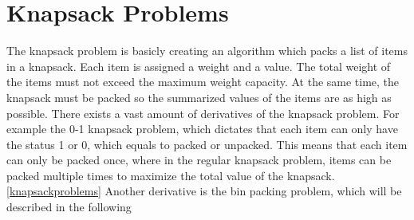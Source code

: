 

\section{Knapsack Problems}
\label{sec:knapsack}
The knapsack problem is basicly creating an algorithm which packs a list of items in a knapsack. Each item is assigned a weight and a value. The total weight of the items must not exceed the maximum weight capacity. At the same time, the knapsack must be packed so the summarized values of the items are as high as possible.   
There exists a vast amount of derivatives of the knapsack problem. For example the 0-1 knapsack problem, which dictates that each item can only have the status 1 or 0, which equals to packed or unpacked. This means that each item can only be packed once, where in the regular knapsack problem, items can be packed multiple times to maximize the total value of the knapsack. \ref{knapsackproblems}
\newline
Another derivative is the bin packing problem, which will be described in the following

